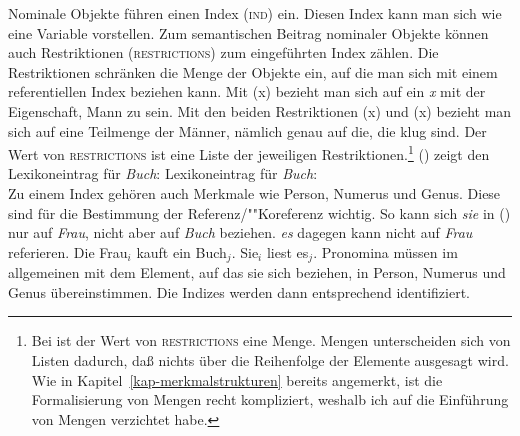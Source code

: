 Nominale Objekte führen einen Index (\textsc{ind}) ein. Diesen Index kann man
sich wie eine Variable vorstellen. Zum semantischen Beitrag nominaler Objekte
können auch Restriktionen (\textsc{restrictions}) zum eingeführten Index zählen.
Die Restriktionen schränken die Menge der Objekte ein, auf die man sich mit einem referentiellen
Index beziehen kann. Mit (x) bezieht man sich auf ein \emph{x} mit der
Eigenschaft, Mann zu sein. Mit den beiden Restriktionen (x) und (x)
bezieht man sich auf eine Teilmenge der Männer, nämlich genau auf die, die klug sind.
Der Wert von \textsc{restrictions} ist eine Liste der jeweiligen Restriktionen.\footnote{
  Bei \citet[]{ps2} ist der Wert von \textsc{restrictions} eine Menge.
  Mengen unterscheiden sich von Listen dadurch, daß nichts über die Reihenfolge 
  der Elemente ausgesagt wird. Wie in Kapitel~\ref{kap-merkmalstrukturen} bereits angemerkt, ist die
  Formalisierung von Mengen recht kompliziert, weshalb ich auf die Einführung von Mengen verzichtet habe.%
}
() zeigt den Lexikoneintrag für \emph{Buch}:
\ea
\label{le-buch}
Lexikoneintrag für \textit{Buch\/}:\\
\z
Zu einem Index gehören auch Merkmale wie Person, Numerus und Genus.
Diese sind für die Bestimmung der Referenz/""Koreferenz wichtig. So kann
sich \emph{sie} in () nur auf \emph{Frau}, nicht aber auf \emph{Buch}
beziehen. \emph{es} dagegen kann nicht auf \emph{Frau} referieren.
\ea
Die Frau$_i$ kauft ein Buch$_j$. Sie$_i$ liest es$_j$.
\z
Pronomina müssen im allgemeinen mit dem Element, auf das sie sich beziehen, in Person,
Numerus und Genus übereinstimmen. Die Indizes werden dann entsprechend identifiziert.
